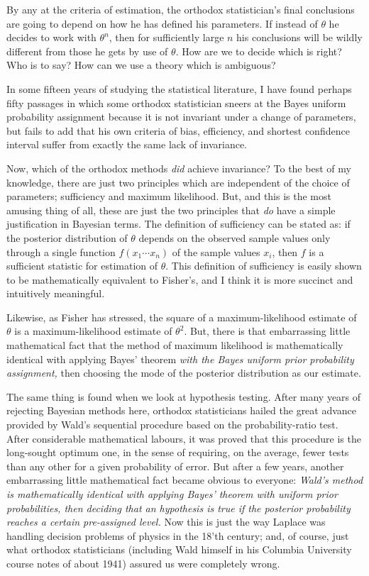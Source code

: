 \documentclass[12pt]{article}
\begin{document}
By any at the criteria of estimation, the orthodox statistician's final conclusions are going to depend on how he has defined his parameters. If instead of $\theta$ he decides to work with $\theta^n$, then for sufficiently large $n$ his conclusions will be wildly different from those he gets by use of $\theta$. How are we to decide which is right? Who is to say? How
can we use a theory which is ambiguous?

In some fifteen years of studying the statistical literature, I have found perhaps fifty passages in which some orthodox statistician sneers at the Bayes uniform probability assignment because it is not invariant under a change of parameters, but fails to add that his own criteria of bias, efficiency, and shortest confidence interval suffer from exactly the same lack of invariance.

Now, which of the orthodox methods \emph{did} achieve invariance? To the best of my knowledge, there are just two principles which are independent of the choice of parameters; sufficiency and maximum likelihood. But, and this is the most amusing thing of all, these are just the two principles that \emph{do} have a simple justification in Bayesian terms. The definition of sufficiency can be stated as: if the posterior distribution of $\theta$ depends on the observed sample values only through a single function $f(x_1 \cdots x_n)$ of the sample values $x_i$, then $f$ is a sufficient statistic for estimation of $\theta$. This definition of
sufficiency is easily shown to be mathematically equivalent to Fisher's, and I think it is more succinct and intuitively meaningful.

Likewise, as Fisher has stressed, the square of a maximum-likelihood estimate of $\theta$ is a maximum-likelihood estimate of $\theta^2$. But, there is that embarrassing little mathematical fact that the method of maximum likelihood is mathematically identical with applying Bayes' theorem \emph{with the Bayes uniform prior probability assignment,} then choosing the mode of the posterior distribution as our estimate.

The same thing is found when we look at hypothesis testing. After many years of rejecting Bayesian methods here, orthodox statisticians hailed the great advance provided by Wald's sequential procedure based on the probability-ratio test. After considerable mathematical labours, it was proved that this procedure is the long-sought optimum one, in the sense of requiring, on the average, fewer tests than any other for a given probability of error. But after a few years, another embarrassing little mathematical fact became obvious to everyone: \emph{Wald's method is mathematically identical with applying Bayes' theorem with uniform prior probabilities, then deciding that an hypothesis is true if the posterior probability reaches a certain pre-assigned level.} Now this is just the way Laplace was handling decision problems of physics in the 18'th century; and, of course, just what orthodox statisticians (including Wald himself in his Columbia University course notes of about 1941) assured us were completely wrong.
\end{document}

